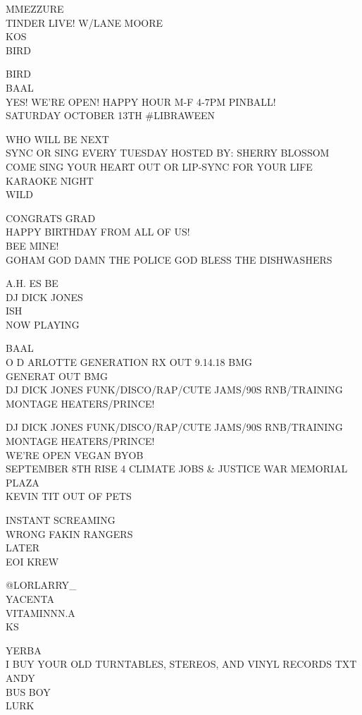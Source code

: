 \documentclass[10pt,letterpaper]{article}
\begin{document}
MMEZZURE\\
TINDER LIVE! W/LANE MOORE\\
KOS\\
BIRD

BIRD\\
BAAL\\
YES!  WE'RE OPEN!  HAPPY HOUR M{-}F 4{-}7PM PINBALL!\\
SATURDAY OCTOBER 13TH \#LIBRAWEEN

WHO WILL BE NEXT\\
SYNC OR SING EVERY TUESDAY HOSTED BY: SHERRY BLOSSOM COME SING YOUR HEART OUT OR LIP{-}SYNC FOR YOUR LIFE\\
KARAOKE NIGHT\\
WILD

CONGRATS GRAD\\
HAPPY BIRTHDAY FROM ALL OF US!\\
BEE MINE!\\
GOHAM GOD DAMN THE POLICE GOD BLESS THE DISHWASHERS

A.H. ES BE\\
DJ DICK JONES\\
ISH\\
NOW PLAYING

BAAL\\
O D ARLOTTE GENERATION RX OUT 9.14.18 BMG\\
GENERAT OUT BMG\\
DJ DICK JONES FUNK/DISCO/RAP/CUTE JAMS/90S RNB/TRAINING MONTAGE HEATERS/PRINCE!

DJ DICK JONES FUNK/DISCO/RAP/CUTE JAMS/90S RNB/TRAINING MONTAGE HEATERS/PRINCE!\\
WE'RE OPEN VEGAN BYOB\\
SEPTEMBER 8TH RISE 4 CLIMATE JOBS \& JUSTICE WAR MEMORIAL PLAZA\\
KEVIN TIT OUT OF PETS

INSTANT SCREAMING\\
WRONG FAKIN RANGERS\\
LATER\\
EOI KREW

@LORLARRY\_\\
YACENTA\\
VITAMINNN.A\\
KS

YERBA\\
I BUY YOUR OLD TURNTABLES, STEREOS, AND VINYL RECORDS TXT ANDY\\
BUS BOY\\
LURK
\end{document}

